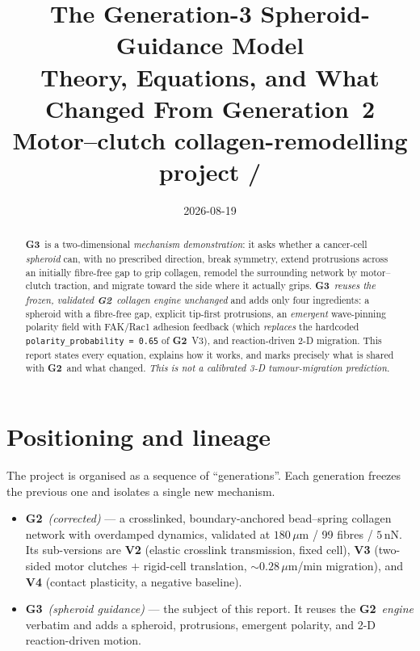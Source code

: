 \documentclass[11pt]{article}
\title{\vspace{-1.2cm}\textbf{The Generation-3 Spheroid-Guidance Model}\\[2pt]
\large Theory, Equations, and What Changed From Generation~2\\[6pt]
\normalsize\textnormal{Motor--clutch collagen-remodelling project \;/\; \code{generations/g3\_spheroid\_guidance}}}
\author{}
\date{2026-08-19}
\newcommand{\umt}{\mu\text{m}}            %
\newcommand{\um}{\,\umt}
\newcommand{\nN}{\,\text{nN}}
\newcommand{\GTwo}{\textcolor{g2col}{\textbf{G2}}}
\newcommand{\GThree}{\textcolor{g3col}{\textbf{G3}}}
\newcommand{\code}[1]{\texttt{\small #1}}
\begin{document}
\maketitle
\vspace{-1.0cm}

\begin{abstract}
\noindent
\GThree\ is a two-dimensional \emph{mechanism demonstration}: it asks whether a cancer-cell
\emph{spheroid} can, with no prescribed direction, break symmetry, extend protrusions across an
initially fibre-free gap to grip collagen, remodel the surrounding network by motor--clutch
traction, and migrate toward the side where it actually grips. \GThree\ \emph{reuses the frozen,
validated \GTwo\ collagen engine unchanged} and adds only four ingredients: a spheroid with a
fibre-free gap, explicit tip-first protrusions, an \emph{emergent} wave-pinning polarity field
with FAK/Rac1 adhesion feedback (which \emph{replaces} the hardcoded
\code{polarity\_probability = 0.65} of \GTwo\ V3), and reaction-driven 2-D migration. This report
states every equation, explains how it works, and marks precisely what is shared with \GTwo\ and
what changed. \emph{This is not a calibrated 3-D tumour-migration prediction.}
\end{abstract}

\tableofcontents
\vspace{4mm}

\section{Positioning and lineage}

The project is organised as a sequence of ``generations''. Each generation freezes the previous
one and isolates a single new mechanism.

\begin{itemize}[leftmargin=1.4em,itemsep=2pt]
  \item \GTwo\ \emph{(corrected)} --- a crosslinked, boundary-anchored bead--spring collagen
        network with overdamped dynamics, validated at $180\um$ / 99 fibres / $5\nN$. Its
        sub-versions are \textbf{V2} (elastic crosslink transmission, fixed cell),
        \textbf{V3} (two-sided motor clutches $+$ rigid-cell translation, $\sim\!0.28\um$/min
        migration), and \textbf{V4} (contact plasticity, a negative baseline).
  \item \GThree\ \emph{(spheroid guidance)} --- the subject of this report. It reuses the \GTwo\
        \emph{engine} verbatim and adds a spheroid, protrusions, emergent polarity, and
        2-D reaction-driven motion.
\end{itemize}
\end{document}
